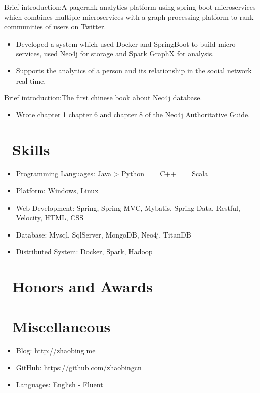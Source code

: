 \documentclass{resume}
\begin{document}
Brief introduction:A pagerank analytics platform using spring boot microservices which combines multiple microservices with a graph processing platform to rank communities of users on Twitter.
\begin{itemize}
  \item Developed a system which used Docker and SpringBoot to build micro services, used Neo4j for storage and Spark GraphX for analysis.
  \item Supports the analytics of a person and its relationship in the social network real-time.
\end{itemize}

Brief introduction:The first chinese book about Neo4j database. 
\begin{itemize}
  \item Wrote chapter 1 chapter 6 and chapter 8 of the Neo4j Authoritative Guide.
\end{itemize}


\section{\faCogs\ Skills}
\begin{itemize}[parsep=0.5ex]
  \item Programming Languages: Java > Python == C++ == Scala
  \item Platform: Windows, Linux
  \item Web Development: Spring, Spring MVC, Mybatis, Spring Data, Restful, Velocity, HTML, CSS
  \item Database: Mysql, SqlServer, MongoDB, Neo4j, TitanDB
  \item Distributed System: Docker, Spark, Hadoop
\end{itemize}

\section{\faHeartO\ Honors and Awards}

\section{\faInfo\ Miscellaneous}
\begin{itemize}[parsep=0.5ex]
  \item Blog: http://zhaobing.me
  \item GitHub: https://github.com/zhaobingcn
  \item Languages: English - Fluent
\end{itemize}

%
%
\end{document}
